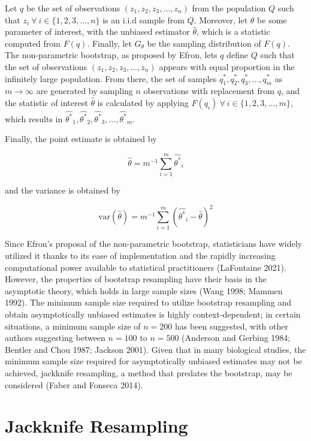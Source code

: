 \documentclass[
  letterpaper,
  DIV=11,
  numbers=noendperiod]{scrreprt}
\begin{document}
Let \(q\) be the set of observations
\(\left(z_1, z_2, z_3, \dots, z_n \right)\) from the population \(Q\)
such that \(z_i \ \forall \ i \in \{1, 2, 3, \dots, n\}\) is an i.i.d
sample from \(Q\). Moreover, let \(\theta\) be some parameter of
interest, with the unbiased estimator \(\hat{\theta}\), which is a
statistic computed from \(F(q)\). Finally, let \(G_{\theta}\) be the
sampling distribution of \(F(q)\). The non-parametric bootstrap, as
proposed by Efron, lets \(q\) define \(Q\) such that the set of
observations \(\left(z_1, z_2, z_3, \dots, z_n \right)\) appears with
equal proportion in the infinitely large population. From there, the set
of samples \(q^*_1, q^*_2, q^*_3, \dots, q^*_m\) as
\(m \rightarrow \infty\) are generated by sampling \(n\) observations
with replacement from \(q\), and the statistic of interest
\(\hat{\theta}\) is calculated by applying
\(F(q_i) \ \forall \ i \in \{1, 2, 3, \dots, m\}\), which results in
\(\hat{\theta^*}_1, \hat{\theta^*}_2, \hat{\theta^*}_3, \dots, \hat{\theta^*}_m\).

Finally, the point estimate is obtained by

\[\hat{\theta} = m^{-1}\sum^m_{i = 1} \hat{\theta^*}_i\]

and the variance is obtained by

\[\text{var}(\hat{\theta}) = m^{-1}\sum^m_{i = 1} \left(\hat{\theta^*}_i - \hat{\theta}\right)^2\]

Since Efron's proposal of the non-parametric bootstrap, statisticians
have widely utilized it thanks to its ease of implementation and the
rapidly increasing computational power available to statistical
practitioners (LaFontaine 2021). However, the properties of bootstrap
resampling have their basis in the asymptotic theory, which holds in
large sample sizes (Wang 1998; Mammen 1992). The minimum sample size
required to utilize bootstrap resampling and obtain asymptotically
unbiased estimates is highly context-dependent; in certain situations, a
minimum sample size of \(n = 200\) has been suggested, with other
authors suggesting between \(n = 100\) to \(n = 500\) (Anderson and
Gerbing 1984; Bentler and Chou 1987; Jackson 2001). Given that in many
biological studies, the minimum sample size required for asymptotically
unbiased estimates may not be achieved, jackknife resampling, a method
that predates the bootstrap, may be considered (Faber and Fonseca 2014).

\hypertarget{jackknife-resampling}{%
\section{Jackknife Resampling}\label{jackknife-resampling}}
\end{document}
